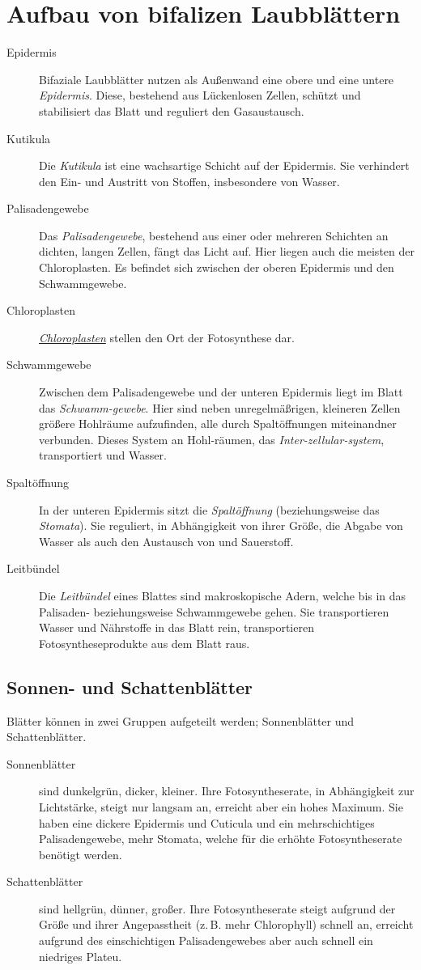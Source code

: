 \documentclass{article}
\begin{document}
\section{Aufbau von bifalizen Laubblättern}
\begin{description} 
 \item[Epidermis] Bifaziale Laubblätter nutzen als Außenwand eine obere und eine untere \emph{Epidermis}. Diese, bestehend aus Lückenlosen Zellen, schützt und stabilisiert das Blatt und reguliert den Gasaustausch.
 \item[Kutikula] Die \emph{Kutikula} ist eine wachsartige Schicht auf der Epidermis. Sie verhindert den Ein- und Austritt von Stoffen, insbesondere von Wasser.
 \item[Palisadengewebe] Das \emph{Palisadengewebe}, bestehend aus einer oder mehreren Schichten an dichten, langen Zellen, fängt das Licht auf. Hier liegen auch die meisten der Chloroplasten. Es befindet sich zwischen der oberen Epidermis und den Schwammgewebe.
 \item[Chloroplasten] \emph{\hyperref[Aufbau der Chloroplasten]{Chloroplasten}} stellen den Ort der Fotosynthese dar.
 \item[Schwammgewebe] Zwischen dem Palisadengewebe und der unteren Epidermis liegt im Blatt das \emph{Schwamm-gewebe}. Hier sind neben unregelmäßrigen, kleineren Zellen größere Hohlräume aufzufinden, alle durch Spaltöffnungen miteinandner verbunden. Dieses System an Hohl-räumen, das \emph{Inter-zellular-system}, transportiert  und Wasser.
 \item[Spaltöffnung] In der unteren Epidermis sitzt die \emph{Spaltöffnung} (beziehungsweise das \emph{Stomata}). Sie reguliert, in Abhängigkeit von ihrer Größe, die Abgabe von Wasser als auch den Austausch von  und Sauerstoff.
 \item[Leitbündel] Die \emph{Leitbündel} eines Blattes sind makroskopische Adern, welche bis in das Palisaden- beziehungsweise Schwammgewebe gehen. Sie transportieren Wasser und Nährstoffe in das Blatt rein, transportieren Fotosyntheseprodukte aus dem Blatt raus.
\end{description}
 
\subsection{Sonnen- und Schattenblätter}
Blätter können in zwei Gruppen aufgeteilt werden; Sonnenblätter und Schattenblätter.
\begin{description}
 \item[Sonnenblätter] sind dunkelgrün, dicker, kleiner. Ihre Fotosyntheserate, in Abhängigkeit zur Lichtstärke, steigt nur langsam an, erreicht aber ein hohes Maximum. Sie haben eine dickere Epidermis und Cuticula und ein mehrschichtiges Palisadengewebe, mehr Stomata, welche für die erhöhte Fotosyntheserate benötigt werden.
 \item[Schattenblätter] sind hellgrün, dünner, großer. Ihre Fotosyntheserate steigt aufgrund der Größe und ihrer Angepasstheit (z.\,B. mehr Chlorophyll) schnell an, erreicht aufgrund des einschichtigen Palisadengewebes aber auch schnell ein niedriges Plateu.
\end{description}
\end{document}
